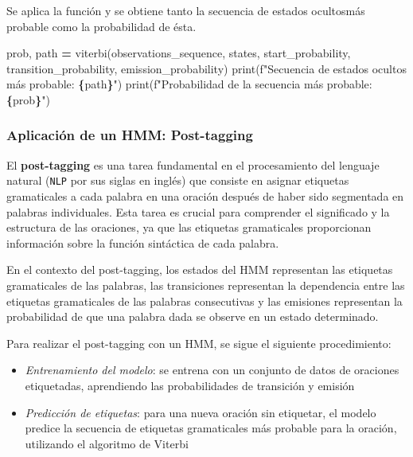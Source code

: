 \documentclass[
  a4paper,
  DIV=11,
  numbers=noendperiod]{scrreprt}
\newenvironment{Shaded}{\begin{snugshade}}{\end{snugshade}}
\newcommand{\BuiltInTok}[1]{#1}
\newcommand{\NormalTok}[1]{#1}
\newcommand{\OperatorTok}[1]{\textcolor[rgb]{0.81,0.36,0.00}{\textbf{#1}}}
\newcommand{\SpecialCharTok}[1]{\textcolor[rgb]{0.81,0.36,0.00}{\textbf{#1}}}
\newcommand{\SpecialStringTok}[1]{\textcolor[rgb]{0.31,0.60,0.02}{#1}}
\begin{document}
Se aplica la función y se obtiene tanto la secuencia de estados
ocultosmás probable como la probabilidad de ésta.

\begin{Shaded}
\begin{Highlighting}[numbers=left,,]
\NormalTok{prob, path }\OperatorTok{=}\NormalTok{ viterbi(observations\_sequence, states, start\_probability, transition\_probability, emission\_probability)}
\BuiltInTok{print}\NormalTok{(}\SpecialStringTok{f"Secuencia de estados ocultos más probable: }\SpecialCharTok{\{}\NormalTok{path}\SpecialCharTok{\}}\SpecialStringTok{"}\NormalTok{)}
\BuiltInTok{print}\NormalTok{(}\SpecialStringTok{f"Probabilidad de la secuencia más probable: }\SpecialCharTok{\{}\NormalTok{prob}\SpecialCharTok{\}}\SpecialStringTok{"}\NormalTok{)}
\end{Highlighting}
\end{Shaded}

\subsubsection{Aplicación de un HMM:
Post-tagging}\label{aplicaciuxf3n-de-un-hmm-post-tagging}

El \textbf{post-tagging} es una tarea fundamental en el procesamiento
del lenguaje natural (\texttt{NLP} por sus siglas en inglés) que
consiste en asignar etiquetas gramaticales a cada palabra en una oración
después de haber sido segmentada en palabras individuales. Esta tarea es
crucial para comprender el significado y la estructura de las oraciones,
ya que las etiquetas gramaticales proporcionan información sobre la
función sintáctica de cada palabra.

En el contexto del post-tagging, los estados del HMM representan las
etiquetas gramaticales de las palabras, las transiciones representan la
dependencia entre las etiquetas gramaticales de las palabras
consecutivas y las emisiones representan la probabilidad de que una
palabra dada se observe en un estado determinado.

Para realizar el post-tagging con un HMM, se sigue el siguiente
procedimiento:

\begin{itemize}
\item
  \emph{Entrenamiento del modelo}: se entrena con un conjunto de datos
  de oraciones etiquetadas, aprendiendo las probabilidades de transición
  y emisión
\item
  \emph{Predicción de etiquetas}: para una nueva oración sin etiquetar,
  el modelo predice la secuencia de etiquetas gramaticales más probable
  para la oración, utilizando el algoritmo de Viterbi
\end{itemize}
\end{document}
